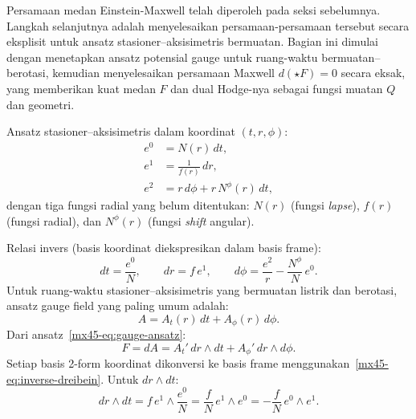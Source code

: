 Persamaan medan Einstein-Maxwell telah diperoleh pada seksi sebelumnya. Langkah selanjutnya adalah menyelesaikan persamaan-persamaan tersebut secara eksplisit untuk ansatz stasioner--aksisimetris bermuatan. Bagian ini dimulai dengan menetapkan ansatz potensial gauge untuk ruang-waktu bermuatan--berotasi, kemudian menyelesaikan persamaan Maxwell $d({\star}F)=0$ secara eksak, yang memberikan kuat medan $F$ dan dual Hodge-nya sebagai fungsi muatan $Q$ dan geometri.

Ansatz stasioner--aksisimetris dalam koordinat $(t, r, \phi)$:
\begin{align}
    e^0 &= N(r)\,dt, \label{mx45-eq:e0}\\
    e^1 &= \frac{1}{f(r)}\,dr, \label{mx45-eq:e1}\\
    e^2 &= r\,d\phi + r\,N^\phi(r)\,dt, \label{mx45-eq:e2}
\end{align}
dengan tiga fungsi radial yang belum ditentukan: $N(r)$ (fungsi \emph{lapse}), $f(r)$ (fungsi radial), dan $N^\phi(r)$ (fungsi \emph{shift} angular).

Relasi invers (basis koordinat diekspresikan dalam basis frame):
\begin{equation}
    dt = \frac{e^0}{N}, \qquad
    dr = f\,e^1, \qquad
    d\phi = \frac{e^2}{r} - \frac{N^\phi}{N}\,e^0. \label{mx45-eq:inverse-dreibein}
\end{equation}
Untuk ruang-waktu stasioner--aksisimetris yang bermuatan listrik dan berotasi, ansatz gauge field yang paling umum adalah:
\begin{equation}
    A = A_t(r)\,dt + A_\phi(r)\,d\phi. \label{mx45-eq:gauge-ansatz}
\end{equation}
Dari ansatz~\eqref{mx45-eq:gauge-ansatz}:
\begin{equation}
    F = dA = A_t'\,dr \wedge dt + A_\phi'\,dr \wedge d\phi. \label{mx45-eq:F-coord}
\end{equation}
Setiap basis 2-form koordinat dikonversi ke basis frame menggunakan~\eqref{mx45-eq:inverse-dreibein}. Untuk $dr \wedge dt$:
\begin{equation}
    dr \wedge dt = f\,e^1 \wedge \frac{e^0}{N}
    = \frac{f}{N}\,e^1 \wedge e^0
    = -\frac{f}{N}\,e^0 \wedge e^1. \label{mx45-eq:dr-dt}
\end{equation}

